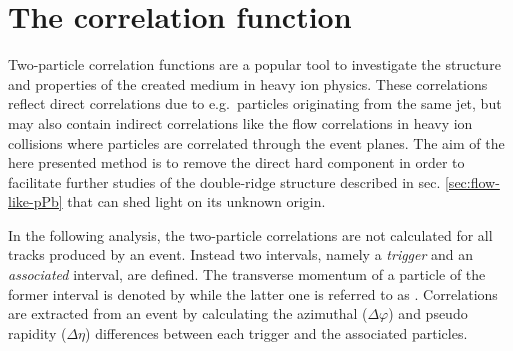 \section{The correlation function}
\label{sec:correlation_function}

Two-particle correlation functions are a popular tool to investigate the structure and properties of the created medium in heavy ion physics. These correlations reflect direct correlations due to e.g.\ particles originating from the same jet, but may also contain indirect correlations like the flow correlations in heavy ion collisions where particles are correlated through the event planes. The aim of the here presented method is to remove the direct hard component in order to facilitate further studies of the double-ridge structure described in sec. \ref{sec:flow-like-pPb} that can shed light on its unknown origin.


In the following analysis, the two-particle correlations are not calculated for all tracks produced by an event. Instead two \pt intervals, namely a \emph{trigger} and an \emph{associated} interval, are defined. The transverse momentum of a particle of the former interval is denoted by \pttrig while the latter one is referred to as \ptassoc. Correlations are extracted from an event by calculating the azimuthal ($\Delta\varphi$) and pseudo rapidity ($\Delta \eta$) differences between each trigger and the associated particles.

